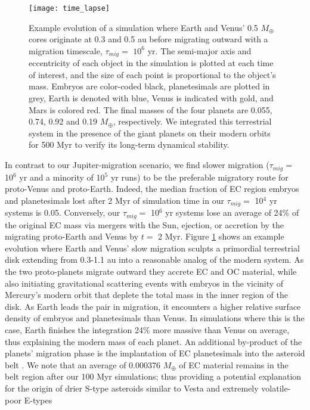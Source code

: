 \documentclass[trackchanges,twocolumn]{aastex}
\begin{document}
\begin{figure}
	\centering
	\texttt{[image: time\_lapse]}
	\caption{Example evolution of a simulation where Earth and Venus' 0.5 $M_{\oplus}$ cores originate at 0.3 and 0.5 au before migrating outward with a migration timescale, $\tau_{mig}=$ $10^{6}$ yr.  The semi-major axis and eccentricity of each object in the simulation is plotted at each time of interest, and the size of each point is proportional to the object's mass.  Embryos are color-coded black, planetesimals are plotted in grey, Earth is denoted with blue, Venus is indicated with gold, and Mars is colored red.  The final masses of the four planets are 0.055, 0.74, 0.92 and 0.19 $M_{\oplus}$, respectively.  We integrated this terrestrial system in the presence of the giant planets on their modern orbits for 500 Myr to verify its long-term dynamical stability.}
	\label{fig:time_lapse}
\end{figure}

In contrast to our Jupiter-migration scenario, we find slower migration ($\tau_{mig}=$ 10$^{6}$ yr and a minority of 10$^{5}$ yr runs) to be the preferable migratory route for proto-Venus and proto-Earth.  Indeed, the median fraction of EC region embryos and planetesimals lost after 2 Myr of simulation time in our $\tau_{mig}=$ 10$^{4}$ yr systems is 0.05.  Conversely, our $\tau_{mig}=$ 10$^{6}$ yr systems lose an average of 24$\%$ of the original EC mass via mergers with the Sun, ejection, or accretion by the migrating proto-Earth and Venus by $t=$ 2 Myr.  Figure \ref{fig:time_lapse} shows an example evolution where Earth and Venus' slow migration sculpts a primordial terrestrial disk extending from 0.3-1.1 au into a reasonable analog of the modern system.  As the two proto-planets migrate outward they accrete EC and OC material, while also initiating gravitational scattering events with embryos in the vicinity of Mercury's modern orbit that deplete the total mass in the inner region of the disk.  As Earth leads the pair in migration, it encounters a higher relative surface density of embryos and planetesimals than Venus.  In simulations where this is the case, Earth finishes the integration 24$\%$ more massive than Venus on average, thus explaining the modern mass of each planet.  An additional by-product of the planets' migration phase is the implantation of EC planetesimals into the asteroid belt \citep[e.g.:][]{ray17sci}.  We note that an average of 0.000376 $M_{\oplus}$ of EC material remains in the belt region after our 100 Myr simulations; thus providing a potential explanation for the origin of drier S-type asteroids similar to Vesta and extremely volatile-poor E-types \citep{zellner77}
\end{document}
